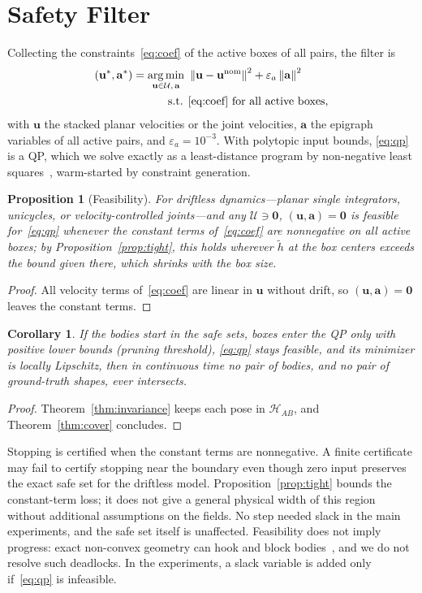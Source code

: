 \documentclass[journal]{IEEEtran}
\newtheorem{proposition}{Proposition}
\newtheorem{corollary}{Corollary}
\theoremstyle{definition}
\newcommand{\norm}[1]{\left\lVert #1\right\rVert}
\DeclareMathOperator*{\argmin}{arg\,min}
\begin{document}
\section{Safety Filter}\label{sec:filter}
Collecting the constraints~\eqref{eq:coef} of the active boxes of all pairs, the filter is
\begin{equation}\label{eq:qp}
\begin{aligned}
(\mathbf u^\ast,\mathbf a^\ast)=\argmin_{\mathbf u\in\mathcal U,\,\mathbf a}\ &\norm{\mathbf u-\mathbf u^{\rm nom}}^2+\varepsilon_a\norm{\mathbf a}^2\\
\text{s.t. }&\eqref{eq:coef}\ \text{for all active boxes},
\end{aligned}
\end{equation}
with $\mathbf u$ the stacked planar velocities or the joint velocities, $\mathbf a$ the epigraph
variables of all active pairs, and $\varepsilon_a=10^{-3}$. With
polytopic input bounds, \eqref{eq:qp} is a QP, which we solve exactly as a least-distance program by
non-negative least squares~\cite{lawson1995solving}, warm-started by constraint generation.
\begin{proposition}[Feasibility]\label{prop:feas}
For driftless dynamics---planar single integrators, unicycles, or velocity-controlled joints---and
any $\mathcal U\ni\mathbf 0$, $(\mathbf u,\mathbf a)=\mathbf 0$ is feasible for~\eqref{eq:qp} whenever
the constant terms of~\eqref{eq:coef} are nonnegative on all active boxes; by
Proposition~\ref{prop:tight}, this holds wherever $\tilde h$ at the box centers exceeds the bound given
there, which shrinks with the box size.
\end{proposition}
\begin{proof}
All velocity terms of~\eqref{eq:coef} are linear in $\mathbf u$ without drift, so
$(\mathbf u,\mathbf a)=\mathbf 0$ leaves the constant terms.
\end{proof}
\begin{corollary}\label{cor:closed}
If the bodies start in the safe sets, boxes enter the QP only with positive lower bounds (pruning
threshold), \eqref{eq:qp} stays feasible, and its minimizer is locally Lipschitz, then in continuous
time no pair of bodies, and no pair of ground-truth shapes, ever intersects.
\end{corollary}
\begin{proof}
Theorem~\ref{thm:invariance} keeps each pose in $\mathcal H_{AB}$, and Theorem~\ref{thm:cover}
concludes.
\end{proof}
Stopping is certified when the constant terms are nonnegative. A finite certificate may fail to
certify stopping near the boundary even though zero input preserves the exact safe set for the
driftless model. Proposition~\ref{prop:tight} bounds the constant-term loss; it does not give a
general physical width of this region without additional assumptions on the fields.
No step needed slack in the main experiments, and the safe set itself is unaffected.
Feasibility does not imply progress: exact non-convex geometry can hook and block
bodies~\cite{reis2020undesirable}, and we do not resolve such deadlocks. In the experiments, a slack
variable is added only if~\eqref{eq:qp} is infeasible.
\end{document}
